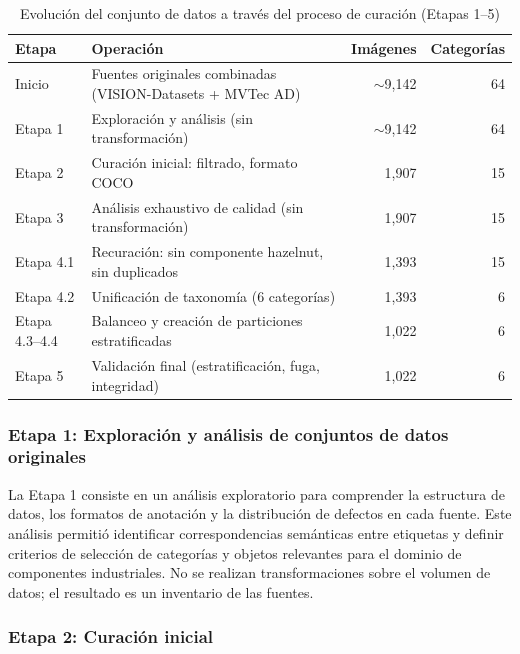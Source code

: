 \begin{table}[H]
\centering
\begin{tabularx}{\textwidth}{@{}l X r r@{}}
\toprule
\textbf{Etapa} & \textbf{Operación} & \textbf{Imágenes} & \textbf{Categorías} \\
\midrule
Inicio       & Fuentes originales combinadas (VISION-Datasets + MVTec AD)  & $\sim$9{,}142 & 64 \\
\midrule
Etapa 1      & Exploración y análisis (sin transformación)                  & $\sim$9{,}142 & 64 \\
Etapa 2      & Curación inicial: filtrado, formato COCO                     & 1{,}907 & 15 \\
Etapa 3      & Análisis exhaustivo de calidad (sin transformación)          & 1{,}907 & 15 \\
Etapa 4.1    & Recuración: sin componente hazelnut, sin duplicados          & 1{,}393 & 15 \\
Etapa 4.2    & Unificación de taxonomía (6 categorías)                      & 1{,}393 & 6  \\
Etapa 4.3--4.4 & Balanceo y creación de particiones estratificadas               & 1{,}022 & 6  \\
Etapa 5      & Validación final (estratificación, fuga, integridad)      & 1{,}022 & 6  \\
\bottomrule
\end{tabularx}
\caption{Evolución del conjunto de datos a través del proceso de curación (Etapas 1--5)}
\label{tab:evolucion_dataset_curacion}
\end{table}

\subsubsection{Etapa 1: Exploración y análisis de conjuntos de datos originales}

La Etapa 1 consiste en un análisis exploratorio para comprender la estructura de datos, los formatos de anotación y la distribución de defectos en cada fuente. Este análisis permitió identificar correspondencias semánticas entre etiquetas y definir criterios de selección de categorías y objetos relevantes para el dominio de componentes industriales. No se realizan transformaciones sobre el volumen de datos; el resultado es un inventario de las fuentes.

\subsubsection{Etapa 2: Curación inicial}

